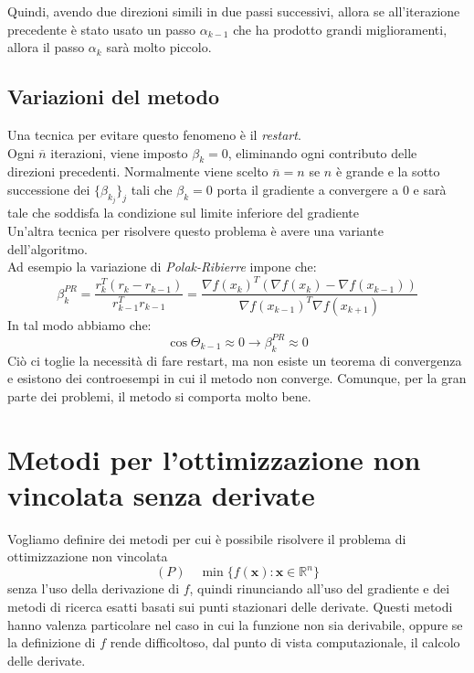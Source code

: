 Quindi, avendo due direzioni simili in due passi successivi, allora se
all'iterazione precedente \`e stato usato un passo $\alpha_{k-1}$ che ha
prodotto grandi miglioramenti, allora il passo $\alpha_{k}$ sarà molto
piccolo.\\
\section{Variazioni del metodo} Una tecnica per evitare questo
fenomeno \`e il \emph{restart}. \\ Ogni $\overline{n}$ iterazioni, viene
imposto $\beta_{k} =0$, eliminando ogni contributo delle direzioni
precedenti.  Normalmente viene scelto $\overline{n} = n $ se $n$ \`e
grande e la sotto successione dei $\{\beta_{k_{j}} \}_{j}$ tali che
$\beta_{k}=0$ porta il gradiente a convergere a 0 e sarà tale che
soddisfa la condizione sul limite inferiore del gradiente \\ Un'altra
tecnica per risolvere questo problema \`e avere una variante
dell'algoritmo.  \\ 
Ad esempio la variazione di \emph{Polak-Ribierre} impone che:
$$\beta_{k}^{PR} = \frac{r_{k}^{T}(r_{k} - r_{k-1}) }{ r^{T}_{k-1} r_{k-1}} = \frac{ \nabla f(x_{k})^{T} (\nabla f(x_{k}) 
  - \nabla f(x_{k-1})) }{\nabla f(x_{k-1})^{T} \nabla f(x_{k+1})}$$ In
tal modo abbiamo che:
$$ \cos \Theta_{k-1} \approx 0 \rightarrow \beta_{k}^{PR} \approx 0$$
Ciò ci toglie la necessità di fare restart, ma non esiste un teorema
di convergenza e esistono dei controesempi in cui il metodo non
converge. Comunque, per la gran parte dei problemi, il metodo si
comporta molto bene.


\chapter{Metodi per l'ottimizzazione non vincolata senza derivate}
Vogliamo definire dei metodi per cui \`e possibile risolvere il problema
di ottimizzazione non vincolata
$$ (P) \quad \min \{ f(\mathbf{x}): \mathbf{x} \in \mathbb{R}^{n}\} $$
senza l'uso della derivazione di $f$, quindi rinunciando all'uso del
gradiente e dei metodi di ricerca esatti basati sui punti stazionari
delle derivate. Questi metodi hanno valenza particolare nel caso in
cui la funzione non sia derivabile, oppure se la definizione di $f$
rende difficoltoso, dal punto di vista computazionale, il calcolo
delle derivate. \\

